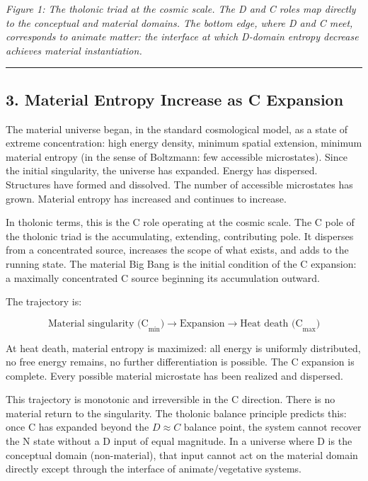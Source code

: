 \documentclass[
  11pt,
  letterpaper,
]{article}
\begin{document}
\emph{Figure 1: The tholonic triad at the cosmic scale. The D and C
roles map directly to the conceptual and material domains. The bottom
edge, where D and C meet, corresponds to animate matter: the interface
at which D-domain entropy decrease achieves material instantiation.}

\begin{center}\rule{0.5\linewidth}{0.5pt}\end{center}

\subsection{3. Material Entropy Increase as C
Expansion}\label{material-entropy-increase-as-c-expansion}

The material universe began, in the standard cosmological model, as a
state of extreme concentration: high energy density, minimum spatial
extension, minimum material entropy (in the sense of Boltzmann: few
accessible microstates). Since the initial singularity, the universe has
expanded. Energy has dispersed. Structures have formed and dissolved.
The number of accessible microstates has grown. Material entropy has
increased and continues to increase.

In tholonic terms, this is the C role operating at the cosmic scale. The
C pole of the tholonic triad is the accumulating, extending,
contributing pole. It disperses from a concentrated source, increases
the scope of what exists, and adds to the running state. The material
Big Bang is the initial condition of the C expansion: a maximally
concentrated C source beginning its accumulation outward.

The trajectory is:

\[\text{Material singularity (C}_\text{min}\text{)} \longrightarrow \text{Expansion} \longrightarrow \text{Heat death (C}_\text{max}\text{)}\]

At heat death, material entropy is maximized: all energy is uniformly
distributed, no free energy remains, no further differentiation is
possible. The C expansion is complete. Every possible material
microstate has been realized and dispersed.

This trajectory is monotonic and irreversible in the C direction. There
is no material return to the singularity. The tholonic balance principle
predicts this: once C has expanded beyond the \(D \approx C\) balance
point, the system cannot recover the N state without a D input of equal
magnitude. In a universe where D is the conceptual domain
(non-material), that input cannot act on the material domain directly
except through the interface of animate/vegetative systems.
\end{document}
